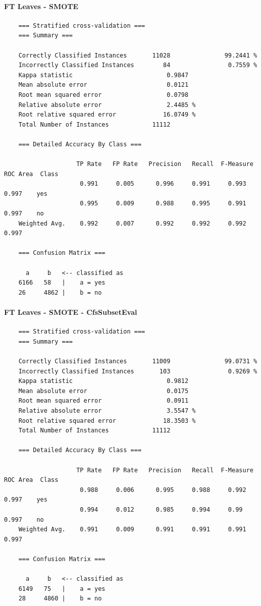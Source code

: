 \paragraph{FT Leaves - SMOTE}
{\footnotesize
	\begin{verbatim}
	=== Stratified cross-validation ===
	=== Summary ===
	
	Correctly Classified Instances       11028               99.2441 %
	Incorrectly Classified Instances        84                0.7559 %
	Kappa statistic                          0.9847
	Mean absolute error                      0.0121
	Root mean squared error                  0.0798
	Relative absolute error                  2.4485 %
	Root relative squared error             16.0749 %
	Total Number of Instances            11112     
	
	=== Detailed Accuracy By Class ===
	
	                TP Rate   FP Rate   Precision   Recall  F-Measure   ROC Area  Class
	                 0.991     0.005      0.996     0.991     0.993      0.997    yes
	                 0.995     0.009      0.988     0.995     0.991      0.997    no
	Weighted Avg.    0.992     0.007      0.992     0.992     0.992      0.997
	
	=== Confusion Matrix ===
	
	  a     b   <-- classified as
	6166   58   |    a = yes
	26     4862 |    b = no
	\end{verbatim}
}

\paragraph{FT Leaves - SMOTE - CfsSubsetEval}
{\footnotesize
	\begin{verbatim}
	=== Stratified cross-validation ===
	=== Summary ===
	
	Correctly Classified Instances       11009               99.0731 %
	Incorrectly Classified Instances       103                0.9269 %
	Kappa statistic                          0.9812
	Mean absolute error                      0.0175
	Root mean squared error                  0.0911
	Relative absolute error                  3.5547 %
	Root relative squared error             18.3503 %
	Total Number of Instances            11112     
	
	=== Detailed Accuracy By Class ===
	
	                TP Rate   FP Rate   Precision   Recall  F-Measure   ROC Area  Class
	                 0.988     0.006      0.995     0.988     0.992      0.997    yes
	                 0.994     0.012      0.985     0.994     0.99       0.997    no
	Weighted Avg.    0.991     0.009      0.991     0.991     0.991      0.997
	
	=== Confusion Matrix ===
	
	  a     b   <-- classified as
	6149   75   |    a = yes
	28     4860 |    b = no	
	\end{verbatim}
}

